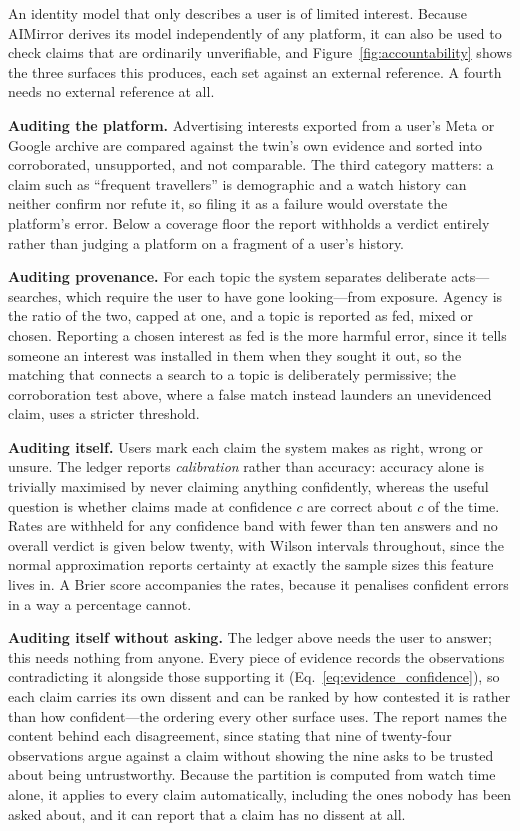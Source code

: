 \documentclass[conference]{IEEEtran}
\begin{document}
An identity model that only describes a user is of limited interest. Because AIMirror derives its model independently of any platform, it can also be used to check claims that are ordinarily unverifiable, and Figure~\ref{fig:accountability} shows the three surfaces this produces, each set against an external reference. A fourth needs no external reference at all.

\textbf{Auditing the platform.} Advertising interests exported from a user's Meta or Google archive are compared against the twin's own evidence and sorted into corroborated, unsupported, and not comparable. The third category matters: a claim such as ``frequent travellers'' is demographic and a watch history can neither confirm nor refute it, so filing it as a failure would overstate the platform's error. Below a coverage floor the report withholds a verdict entirely rather than judging a platform on a fragment of a user's history.

\textbf{Auditing provenance.} For each topic the system separates deliberate acts---searches, which require the user to have gone looking---from exposure. Agency is the ratio of the two, capped at one, and a topic is reported as fed, mixed or chosen. Reporting a chosen interest as fed is the more harmful error, since it tells someone an interest was installed in them when they sought it out, so the matching that connects a search to a topic is deliberately permissive; the corroboration test above, where a false match instead launders an unevidenced claim, uses a stricter threshold.

\textbf{Auditing itself.} Users mark each claim the system makes as right, wrong or unsure. The ledger reports \emph{calibration} rather than accuracy: accuracy alone is trivially maximised by never claiming anything confidently, whereas the useful question is whether claims made at confidence $c$ are correct about $c$ of the time. Rates are withheld for any confidence band with fewer than ten answers and no overall verdict is given below twenty, with Wilson intervals throughout, since the normal approximation reports certainty at exactly the sample sizes this feature lives in. A Brier score accompanies the rates, because it penalises confident errors in a way a percentage cannot.

\textbf{Auditing itself without asking.} The ledger above needs the user to answer; this needs nothing from anyone. Every piece of evidence records the observations contradicting it alongside those supporting it (Eq.~\eqref{eq:evidence_confidence}), so each claim carries its own dissent and can be ranked by how contested it is rather than how confident---the ordering every other surface uses. The report names the content behind each disagreement, since stating that nine of twenty-four observations argue against a claim without showing the nine asks to be trusted about being untrustworthy. Because the partition is computed from watch time alone, it applies to every claim automatically, including the ones nobody has been asked about, and it can report that a claim has no dissent at all.
\end{document}
